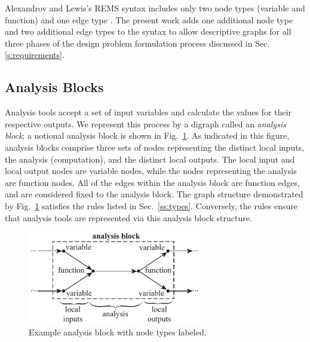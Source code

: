  Alexandrov and Lewis's REMS syntax includes only two node types (variable and function) 
  and one edge type   \cite{alexandrov2004}. The present work adds one additional 
  node type and two additional edge types to the syntax to allow descriptive
  graphs for all three phases of the design problem formulation process discussed 
  in Sec. \ref{s:requirements}.

\subsection{Analysis Blocks}
\label{ss:analysis blocks}
  Analysis tools accept a set of input variables and calculate 
  the values for their respective outputs. We represent this process
  by a digraph called an \emph{analysis block}; a notional analysis block is shown 
  in Fig.~\ref{f:analysis block}. 
  As indicated in this figure, analysis blocks comprise three sets of nodes 
  representing the distinct local inputs, the analysis (computation), and the 
  distinct local outputs. The local input and local output nodes are variable 
  nodes, while the nodes representing the analysis are function nodes. All of 
  the edges within the analysis block are function edges, and are considered 
  fixed to the analysis block. The graph structure demonstrated by 
  Fig.~\ref{f:analysis block} satisfies the rules listed in Sec.~\ref{ss:types}. 
  Conversely, the rules ensure that analysis tools are represented via this analysis 
  block structure.

  \begin{figure}[htb]
      \begin{center}
      \includegraphics[width=3.0in]{images/analysis_block}
      \end{center}
      \vspace{-10pt}
  \caption{Example analysis block with node types labeled.}
  \label{f:analysis block}
  \end{figure}


